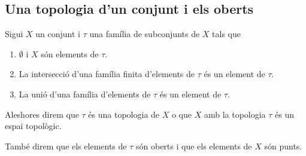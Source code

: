 \documentclass[../../Main.tex]{subfiles}
\begin{document}
	\subsection{Una topologia d'un conjunt i els oberts}
	\begin{definition}[Topologia]	%
		\label{def:topologia}
		\label{def:espai topològic}
		\label{def:obert}
		\label{def:punt}
		Sigui \(X\) un conjunt i \(\tau\) una família de subconjunts de \(X\) tals que
		\begin{enumerate}
		\item \(\emptyset\) i \(X\) són elements de \(\tau\).
		\item La intersecció d'una família finita d'elements de \(\tau\) és un element de \(\tau\).
		\item La unió d'una família d'elements de \(\tau\) és un element de \(\tau\).
		\end{enumerate}
		Aleshores direm que \(\tau\) és una topologia de \(X\) o que \(X\) amb la topologia \(\tau\) és un espai topològic.
		
		També direm que els elements de \(\tau\) són oberts i que els elements de \(X\) són punts.
	\end{definition}
\end{document}
